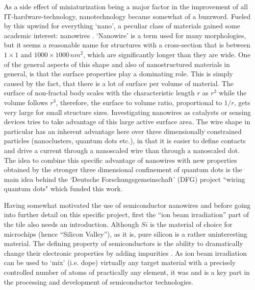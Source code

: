 As a side effect of miniaturization being a major factor in the improvement of all IT-hardware-technology, nanotechnology became somewhat of a buzzword. Fueled by this upwind for everything `nano', a peculiar class of materials gained some academic interest: nanowires \cite{huang_room-temperature_2001,cui_nanowire_2001,duan_indium_2001,xia_one-dimensional_2003,lieber_functional_2007}. `Nanowire' is a term used for many morphologies, but it seems a reasonable name for structures with a cross-section that is between $1\times1$ and $1000\times1000\,nm^2$, which are significantly longer than they are wide. One of the general aspects of this shape and also of nanostructured materials in general, is that the surface properties play a dominating role. This is simply caused by the fact, that there is a lot of surface per volume of material. The surface of non-fractal body scales with the characteristic length $r$ as $r^2$ while the volume follows $r^3$, therefore, the surface to volume ratio, proportional to $1/r$, gets very large for small structure sizes. Investigating nanowires as catalysts or sensing devices tries to take advantage of this large active surface area. The wire shape in particular has an inherent advantage here over three dimensionally constrained particles (nanoclusters, quantum dots etc.), in that it is easier to define contacts and drive a current through a nanoscaled wire than through a nanoscaled dot. The idea to combine this specific advantage of nanowires with new properties obtained by the stronger three dimensional confinement of quantum dots is the main idea behind the `Deutsche Forschungsgemeinschaft' (DFG) project ``wiring quantum dots" which funded this work. 

Having somewhat motivated the use of semiconductor nanowires and before going into further detail on this specific project, first the ``ion beam irradiation'' part of the tile also needs an introduction. Although $Si$ is the material of choice for microchips (hence ``Silicon Valley''), as it is, pure silicon is a rather uninteresting material. The defining property of semiconductors is the ability to dramatically change their electronic properties by adding impurities \cite{sze_physics_2006}. As ion beam irradiation can be used to `mix' (i.e. dope) virtually any target material with a precisely controlled number of atoms of practically any element, it was and is a key part in the processing and development of semiconductor technologies. 

